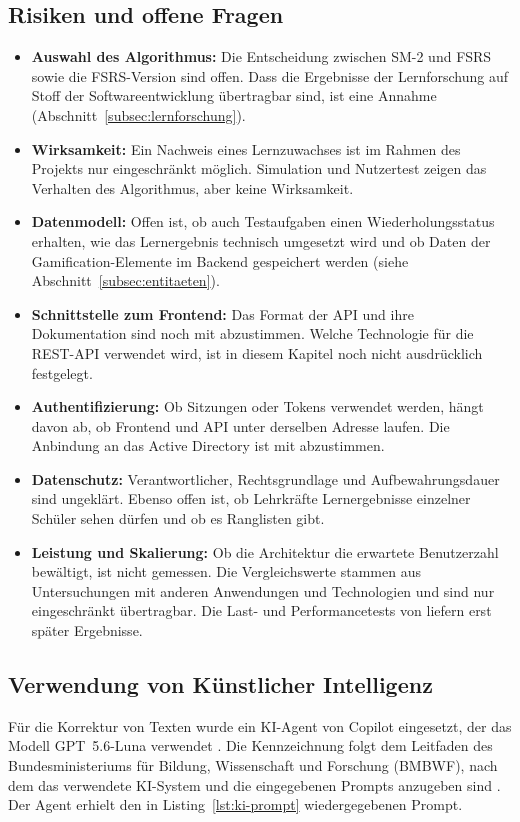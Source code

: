 \subsection{Risiken und offene Fragen}
\label{subsec:risiken}
\begin{itemize}
  \item \textbf{Auswahl des Algorithmus:} Die Entscheidung zwischen SM-2 und FSRS sowie die FSRS-Version sind offen. Dass die Ergebnisse der Lernforschung auf Stoff der Softwareentwicklung übertragbar sind, ist eine Annahme (Abschnitt~\ref{subsec:lernforschung}).
  \item \textbf{Wirksamkeit:} Ein Nachweis eines Lernzuwachses ist im Rahmen des Projekts nur eingeschränkt möglich. Simulation und Nutzertest zeigen das Verhalten des Algorithmus, aber keine Wirksamkeit.
  \item \textbf{Datenmodell:} Offen ist, ob auch Testaufgaben einen Wiederholungsstatus erhalten, wie das Lernergebnis technisch umgesetzt wird und ob Daten der Gamification-Elemente im Backend gespeichert werden (siehe Abschnitt~\ref{subsec:entitaeten}).
  \item \textbf{Schnittstelle zum Frontend:} Das Format der API und ihre Dokumentation sind noch mit \Jakob abzustimmen. Welche Technologie für die REST-API verwendet wird, ist in diesem Kapitel noch nicht ausdrücklich festgelegt.
  \item \textbf{Authentifizierung:} Ob Sitzungen oder Tokens verwendet werden, hängt davon ab, ob Frontend und API unter derselben Adresse laufen. Die Anbindung an das Active Directory ist mit \Jai abzustimmen.
  \item \textbf{Datenschutz:} Verantwortlicher, Rechtsgrundlage und Aufbewahrungsdauer sind ungeklärt. Ebenso offen ist, ob Lehrkräfte Lernergebnisse einzelner Schüler sehen dürfen und ob es Ranglisten gibt.
  \item \textbf{Leistung und Skalierung:} Ob die Architektur die erwartete Benutzerzahl bewältigt, ist nicht gemessen. Die Vergleichswerte stammen aus Untersuchungen mit anderen Anwendungen und Technologien und sind nur eingeschränkt übertragbar. Die Last- und Performancetests von \Jai liefern erst später Ergebnisse.
\end{itemize}
\subsection{Verwendung von Künstlicher Intelligenz}
\label{subsec:ki-verwendung}
Für die Korrektur von Texten wurde ein KI-Agent von Copilot eingesetzt, der das Modell GPT~5.6-Luna verwendet \parencite{copilotKorrektur2026}. Die Kennzeichnung folgt dem Leitfaden des Bundesministeriums für Bildung, Wissenschaft und Forschung (BMBWF), nach dem das verwendete KI-System und die eingegebenen Prompts anzugeben sind \parencite[S.~3--4]{bmbwf2023ki}.
Der Agent erhielt den in Listing~\ref{lst:ki-prompt} wiedergegebenen Prompt.
 
